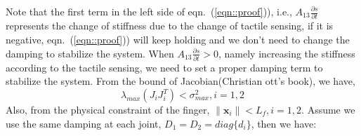 \documentclass[]{article}
\begin{document}
Note that the first term in the left side of eqn.~(\ref{eqn::proof})), i.e., $A_{13}\frac{\partial s}{\partial t}$ represents the change of stiffness due to the change of tactile sensing, if it is negative, eqn.~(\ref{eqn::proof})) will keep holding and we don't need to change the damping to stabilize the system. When $A_{13}\frac{\partial s}{\partial t}>0$, namely increasing the stiffness according to the tactile sensing, we need to set a proper damping term to stabilize the system.
From the bound of Jacobian(Christian ott's book), we have,
\begin{equation}
\lambda_{max}(J_iJ_i^T)<\sigma_{max}^2, i=1,2
\end{equation}
Also, from the physical constraint of the finger, $\|\mathbf{x}_i\|<L_f, i=1,2$. Assume we use the same damping at each joint, $D_1=D_2=diag\{d_i\}$, then we have:
\begin{equation}
\end{equation}
\end{document}
